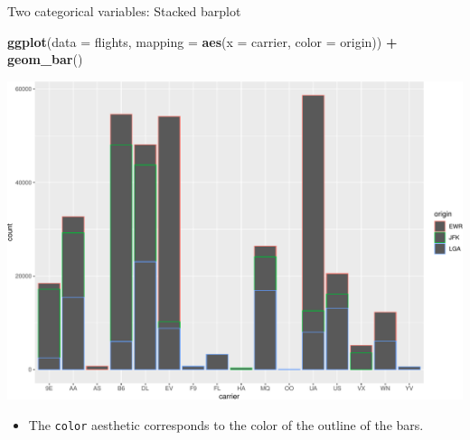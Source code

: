 \documentclass[
  ignorenonframetext,
]{beamer}
\newenvironment{Shaded}{\begin{snugshade}}{\end{snugshade}}
\newcommand{\AttributeTok}[1]{\textcolor[rgb]{0.13,0.29,0.53}{#1}}
\newcommand{\FunctionTok}[1]{\textcolor[rgb]{0.13,0.29,0.53}{\textbf{#1}}}
\newcommand{\NormalTok}[1]{#1}
\newcommand{\SpecialCharTok}[1]{\textcolor[rgb]{0.81,0.36,0.00}{\textbf{#1}}}
\providecommand{\tightlist}{%
  \setlength{\itemsep}{0pt}\setlength{\parskip}{0pt}}
\begin{document}
\begin{frame}[fragile]{Two categorical variables: Stacked barplot}
\protect\hypertarget{two-categorical-variables-stacked-barplot-1}{}
\tiny

\begin{Shaded}
\begin{Highlighting}[]
\FunctionTok{ggplot}\NormalTok{(}\AttributeTok{data =}\NormalTok{ flights, }\AttributeTok{mapping =} \FunctionTok{aes}\NormalTok{(}\AttributeTok{x =}\NormalTok{ carrier, }\AttributeTok{color =}\NormalTok{ origin)) }\SpecialCharTok{+}
  \FunctionTok{geom\_bar}\NormalTok{()}
\end{Highlighting}
\end{Shaded}

\begin{center}\includegraphics[width=0.9\linewidth,height=0.5\textheight]{Week2_files/figure-beamer/unnamed-chunk-43-1} \end{center}
\normalsize

\begin{itemize}
\tightlist
\item
  The \texttt{color} aesthetic corresponds to the color of the outline
  of the bars.
\end{itemize}
\end{frame}
\end{document}
